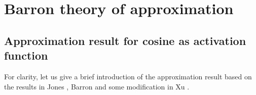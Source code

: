 
\section{Barron theory of approximation}
\subsection{Approximation result for cosine as activation function}
For clarity, let us give a brief introduction of the approximation
result based on the results in Jones \cite{jones1992simple}, Barron \cite{barron1993universal} and some
modification in Xu \cite{xu2017approximation}.


